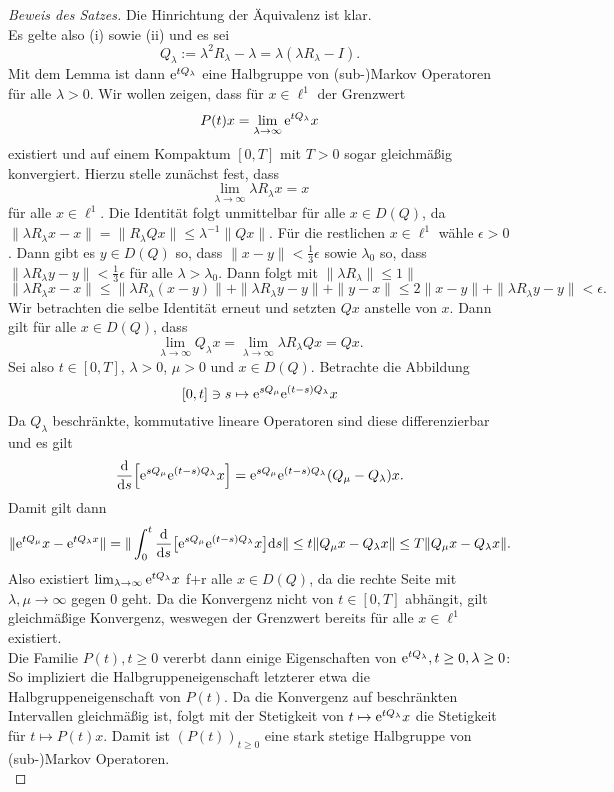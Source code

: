 \begin{proof}[Beweis des Satzes] Die Hinrichtung der Äquivalenz ist klar. \\Es gelte also (i) sowie (ii) und es sei 
$$Q_\lambda:=\lambda^2 R_\lambda -\lambda=\lambda(\lambda R_\lambda -I).$$
Mit dem Lemma ist dann $\text e^{t Q_\lambda}$ eine Halbgruppe von (sub-)Markov Operatoren für alle $\lambda>0$. Wir wollen zeigen, dass für $x\in\ell^1$ der Grenzwert $$P(t)x=\lim_{\lambda\to\infty}\text e^{tQ_\lambda}x$$ existiert und auf einem Kompaktum $[0,T]$ mit $T>0$ sogar gleichmäßig konvergiert. Hierzu stelle zunächst fest, dass $$\lim_{\lambda\to\infty}\lambda R_\lambda x=x$$ für alle $x\in\ell^1$. Die Identität folgt unmittelbar für alle $x\in D(Q)$, da  $\|\lambda R_\lambda x-x\|=\|R_\lambda Qx\|\leq \lambda^{-1}\|Qx\|$. Für die restlichen $x\in\ell^1$  wähle $\epsilon >0$. Dann gibt es $y\in  D(Q)$ so, dass $\|x-y\|<\frac{1}{3}\epsilon$ sowie $\lambda_0$ so, dass $\|\lambda R_\lambda y-y\|< \frac{1}{3}\epsilon$ für alle $\lambda > \lambda_0$. Dann folgt mit $\|\lambda R_\lambda\|\leq 1\|$$$\|\lambda R_\lambda x-x\|\leq\|\lambda R_\lambda(x-y)\|+\|\lambda R_\lambda y-y\|+\|y-x\|\leq 2\|  x-y\|+\|\lambda R_\lambda y-y\|<\epsilon.$$ Wir betrachten die selbe Identität erneut und setzten $Qx$ anstelle von $x$. Dann gilt für alle $x\in D(Q)$, dass $$\lim_{\lambda\to\infty}Q_\lambda x=\lim_{\lambda\to\infty}\lambda R_\lambda Qx= Qx.$$  
Sei also $t\in[0,T]$, $\lambda >0$, $\mu>0$ und $x\in D(Q)$. Betrachte die Abbildung $$[0,t]\ni s\mapsto \text e^{sQ_\mu}\text e^{(t-s)Q_\lambda}x$$ Da $Q_\lambda$ beschränkte, kommutative lineare Operatoren sind diese differenzierbar und es gilt $$\frac{\text d}{\text ds}\Big[\text e^{sQ_\mu}\text e^{(t-s)Q_\lambda}x\Big]=\text e^{s Q_\mu}\text e^{(t-s)Q_\lambda}(Q_\mu- Q_\lambda)x.$$ Damit gilt dann $$\|\text e^{tQ_\mu}x -\text e^{tQ_\lambda x}\|=\|\int_0^t\frac{\text d}{\text ds}\big[\text e^{sQ_\mu}\text e^{(t-s)Q_\lambda} x\big]\text ds\|\leq t\|Q_\mu x- Q_\lambda x\|\leq T\|Q_\mu x- Q_\lambda x\|.$$ Also existiert $\lim_{\lambda\to\infty} \text e^{t Q_\lambda} x$ f+r alle $x\in D(Q)$, da die rechte Seite mit $\lambda, \mu\to\infty$ gegen $0$ geht.  Da die Konvergenz nicht von $t\in[0,T]$ abhängit, gilt gleichmäßige Konvergenz, weswegen der Grenzwert bereits für alle $x\in\ell^1$ existiert. \\
Die Familie $P(t),t\geq0$ vererbt dann einige Eigenschaften von $\text e^{t Q_\lambda}, t\geq0, \lambda \geq0$: So impliziert die Halbgruppeneigenschaft letzterer etwa die Halbgruppeneigenschaft von $P(t)$. Da die Konvergenz auf beschränkten Intervallen gleichmäßig ist, folgt mit der Stetigkeit von $t\mapsto\text e^{t Q_\lambda}x$ die Stetigkeit für $t\mapsto P(t)x$. Damit ist $(P(t))_{t\geq0}$ eine stark stetige Halbgruppe von (sub-)Markov Operatoren.\\

\end{proof}
